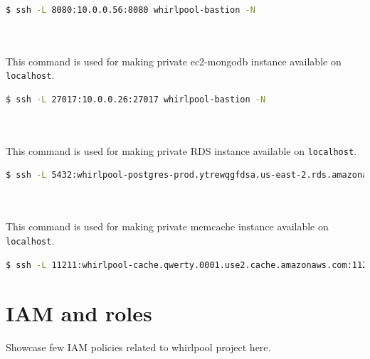 \begin{lstlisting}[language=bash]
  $ ssh -L 8080:10.0.0.56:8080 whirlpool-bastion -N
\end{lstlisting}
\\
\\
\noident
This command is used for making private ec2-mongodb instance available on \texttt{localhost}.
\begin{lstlisting}[language=bash]
  $ ssh -L 27017:10.0.0.26:27017 whirlpool-bastion -N
\end{lstlisting}
\\
\\
\noindent
This command is used for making private RDS instance available on \texttt{localhost}.
\begin{lstlisting}[language=bash]
  $ ssh -L 5432:whirlpool-postgres-prod.ytrewqgfdsa.us-east-2.rds.amazonaws.com:5432 whirlpool-bastion -N
\end{lstlisting}
\\
\\
\noindent
This command is used for making private memcache instance available on \texttt{localhost}.
\begin{lstlisting}[language=bash]
  $ ssh -L 11211:whirlpool-cache.qwerty.0001.use2.cache.amazonaws.com:11211 whirlpool-bastion -N
\end{lstlisting}

\pagebreak

\section{IAM and roles}\label{iamroles}
Showcase few IAM policies related to whirlpool project here.

